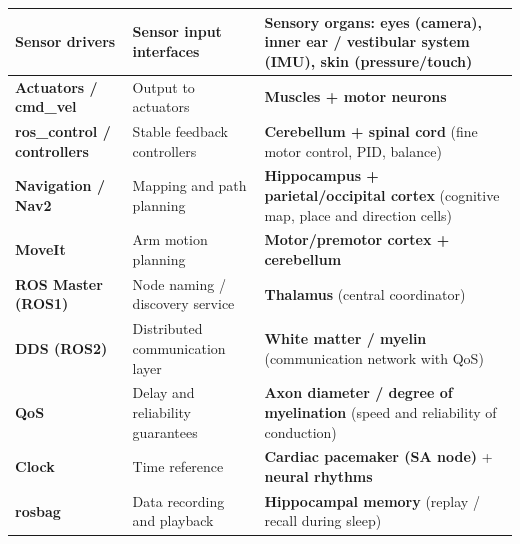 \documentclass{book}
\begin{document}
\begin{table}[h!]
{\begin{tabular}{|>{\raggedright\arraybackslash}p{3cm}|>{\raggedright\arraybackslash}p{4cm}|>{\raggedright\arraybackslash}p{8.5cm}|}
                \hline
                \textbf{Sensor drivers}             & Sensor input interfaces                & \textbf{Sensory organs:} eyes (camera), inner ear / vestibular system (IMU), skin (pressure/touch)                  \\
                \hline
                \textbf{Actuators / cmd\_vel}       & Output to actuators                    & \textbf{Muscles + motor neurons}                                                                                    \\
                \hline
                \textbf{ros\_control / controllers} & Stable feedback controllers            & \textbf{Cerebellum + spinal cord} (fine motor control, PID, balance)                                                \\
                \hline
                \textbf{Navigation / Nav2}          & Mapping and path planning              & \textbf{Hippocampus + parietal/occipital cortex} (cognitive map, place and direction cells)                         \\
                \hline
                \textbf{MoveIt}                     & Arm motion planning                    & \textbf{Motor/premotor cortex + cerebellum}                                                                         \\
                \hline
                \textbf{ROS Master (ROS1)}          & Node naming / discovery service        & \textbf{Thalamus} (central coordinator)                                                                             \\
                \hline
                \textbf{DDS (ROS2)}                 & Distributed communication layer        & \textbf{White matter / myelin} (communication network with QoS)                                                     \\
                \hline
                \textbf{QoS}                        & Delay and reliability guarantees       & \textbf{Axon diameter / degree of myelination} (speed and reliability of conduction)                                \\
                \hline
                \textbf{Clock}                      & Time reference                         & \textbf{Cardiac pacemaker (SA node)} + \textbf{neural rhythms}                                                      \\
                \hline
                \textbf{rosbag}                     & Data recording and playback            & \textbf{Hippocampal memory} (replay / recall during sleep)                                                          \\

\end{tabular}}
\end{table}
\end{document}

